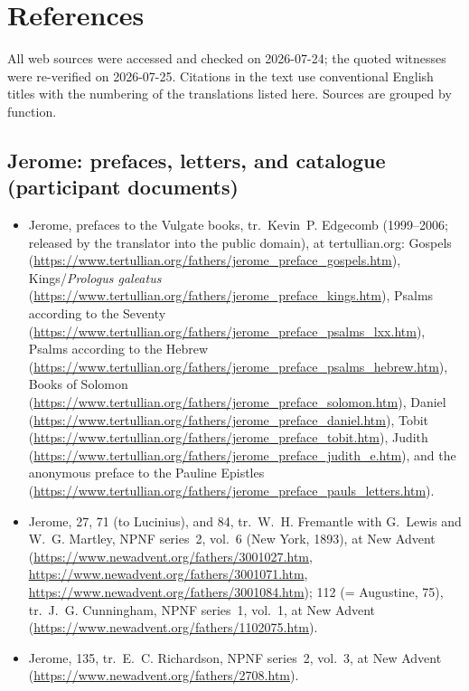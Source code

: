 \section{References}

All web sources were accessed and checked on 2026-07-24; the quoted
witnesses were re-verified on 2026-07-25. Citations in the
text use conventional English titles with the numbering of the
translations listed here. Sources are grouped by function.

\subsection*{Jerome: prefaces, letters, and catalogue (participant
documents)}

\begin{itemize}
\item Jerome, prefaces to the Vulgate books, tr.\ Kevin~P. Edgecomb
(1999--2006; released by the translator into the public domain), at
tertullian.org: Gospels
(\url{https://www.tertullian.org/fathers/jerome_preface_gospels.htm}),
Kings/\textit{Prologus galeatus}
(\url{https://www.tertullian.org/fathers/jerome_preface_kings.htm}),
Psalms according to the Seventy
(\url{https://www.tertullian.org/fathers/jerome_preface_psalms_lxx.htm}),
Psalms according to the Hebrew
(\url{https://www.tertullian.org/fathers/jerome_preface_psalms_hebrew.htm}),
Books of Solomon
(\url{https://www.tertullian.org/fathers/jerome_preface_solomon.htm}),
Daniel
(\url{https://www.tertullian.org/fathers/jerome_preface_daniel.htm}),
Tobit
(\url{https://www.tertullian.org/fathers/jerome_preface_tobit.htm}),
Judith
(\url{https://www.tertullian.org/fathers/jerome_preface_judith_e.htm}),
and the anonymous  preface to the Pauline
Epistles
(\url{https://www.tertullian.org/fathers/jerome_preface_pauls_letters.htm}).
\item Jerome,  27, 71 (to Lucinius), and 84, tr.\ W.~H.
Fremantle with
G.~Lewis and W.~G. Martley, NPNF series~2, vol.~6 (New York, 1893), at
New Advent (\url{https://www.newadvent.org/fathers/3001027.htm},
\url{https://www.newadvent.org/fathers/3001071.htm},
\url{https://www.newadvent.org/fathers/3001084.htm});  112
(= Augustine,  75), tr.\ J.~G. Cunningham, NPNF series~1,
vol.~1, at New Advent
(\url{https://www.newadvent.org/fathers/1102075.htm}).
\item Jerome,  135, tr.\ E.~C. Richardson, NPNF
series~2, vol.~3, at New Advent
(\url{https://www.newadvent.org/fathers/2708.htm}).
\end{itemize}

